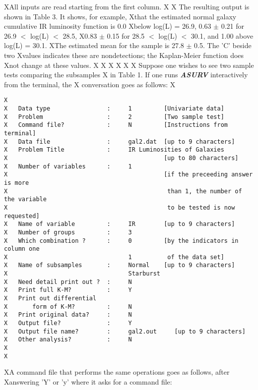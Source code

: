 XAll inputs are read starting from the first column.  
X
X     The resulting output is shown in Table 3.  It shows, for example, 
Xthat the estimated normal galaxy cumulative IR luminosity  function is 0.0
Xbelow log(L) = 26.9, 0.63 $\pm$ 0.21 for 26.9 $<$  log(L) $<$ 28.5, 
X0.83 $\pm$ 0.15 for 28.5 $<$ log(L) $<$ 30.1, and 1.00 above log(L) = 30.1.
XThe estimated mean for the sample is 27.8 $\pm$ 0.5.  The 'C' beside two 
Xvalues indicates these are nondetections;  the Kaplan-Meier function does 
Xnot change at these values.
X
X\bigskip
X\bigskip
X
X
X       Suppose one wishes to see two sample tests comparing the  subsamples
X  in Table 1. If one runs {\sl\bf ASURV} interactively from the terminal, the
X  conversation goes as follows:
X\begin{verbatim}  
X
X   Data type                :     1         [Univariate data]
X   Problem                  :     2         [Two sample test]
X   Command file?            :     N         [Instructions from terminal]
X   Data file                :     gal2.dat  [up to 9 characters]
X   Problem Title            :     IR Luminosities of Galaxies
X                                            [up to 80 characters]
X   Number of variables      :     1 
X                                            [if the preceeding answer is more
X                                             than 1, the number of the variable
X                                             to be tested is now requested]
X   Name of variable         :     IR        [up to 9 characters]
X   Number of groups         :     3
X   Which combination ?      :     0         [by the indicators in column one 
X                                  1          of the data set]
X   Name of subsamples       :     Normal    [up to 9 characters]
X                                  Starburst 
X   Need detail print out ?  :     N
X   Print full K-M?          :     Y 
X   Print out differential
X       form of K-M?         :     N
X   Print original data?     :     N
X   Output file?             :     Y
X   Output file name?        :     gal2.out     [up to 9 characters]
X   Other analysis?          :     N
X 
X\end{verbatim}
XA command file that performs the same operations goes as follows, after 
Xanswering 'Y' or 'y' where it asks for a command file:
